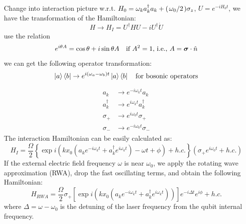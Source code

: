 \documentclass{simple-notes}
\begin{document}
Change into interaction picture w.r.t. $H_0 = \omega_k a_k^\dagger a_k +  (\flatfrac{\omega_0}{2}) \sigma_z$, $U = e^{-i H_0 t}$, we have the transformation of the Hamiltonian:
\begin{equation}
    H \to H_I = U^\dagger H U - i U^\dagger \dot{U}
\end{equation}
use the relation 
\begin{equation}
    e^{i\theta A} = \cos\theta + i \sin\theta A \quad \text{if $A^2 = 1$, i.e., $A = \vb* \sigma \cdot \hat{n}$}
\end{equation}
we can get the following operator transformation:
\begin{align}
    \ket{a}\bra{b} \to e^{i(\omega_a - \omega_b) t} \ket{a}\bra{b}\quad \text{for bosonic operators}
\end{align}
\begin{align*}
    \begin{split}
    a_k &\to  e^{-i \omega_k t} a_k \\
    a_k^\dagger &\to e^{i \omega_k t} a_k^\dagger \\
    \sigma_+ &\to e^{i \omega_0 t} \sigma_+ \\
    \sigma_- &\to e^{-i \omega_0 t} \sigma_-
    \end{split}
\end{align*}
The interaction Hamiltonian can be easily calculated as:
\begin{equation}
    H_I =  \frac{\Omega}{2} \left\{\exp i \left(k x_0 (a_k e^{-i \omega_k t} + a_k^\dagger e^{i \omega_k t}) - \omega t + \phi\right) + h.c.\right\} (\sigma_+ e^{i \omega_0 t} + h.c.)
\end{equation}
If the external electric field frequency $\omega$ is near $\omega_0$, we apply the rotating wave approximation (RWA), drop the fast oscillating terms, and obtain the following Hamiltonian:
\begin{equation}
    H_{\textit{RWA}} =  \frac{\Omega}{2}\sigma_+ \left[\exp i \left(k x_0 (a_k e^{-i \omega_k t} + a_k^\dagger e^{i \omega_k t})\right)\right]e^{-i\Delta t}e^{i\phi} + h.c.  \tag{Hamiltonian with RWA}
\end{equation}
where $\Delta = \omega - \omega_0$ is the detuning of the laser frequency from the qubit internal frequency.
\end{document}
